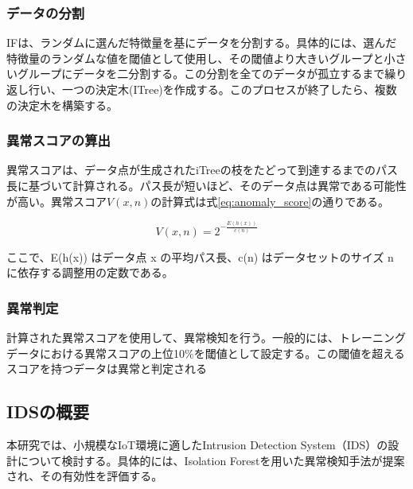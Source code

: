 \documentclass{css}
\begin{document}
\subsubsection{データの分割}

IFは、ランダムに選んだ特徴量を基にデータを分割する。具体的には、選んだ特徴量のランダムな値を閾値として使用し、その閾値より大きいグループと小さいグループにデータを二分割する。この分割を全てのデータが孤立するまで繰り返し行い、一つの決定木(ITree)を作成する。このプロセスが終了したら、複数の決定木を構築する。

\subsubsection{異常スコアの算出}

異常スコアは、データ点が生成されたiTreeの枝をたどって到達するまでのパス長に基づいて計算される。パス長が短いほど、そのデータ点は異常である可能性が高い。異常スコア$V(x,n)$の計算式は式\ref{eq:anomaly_score}の通りである。


\begin{equation}
    V(x, n) = 2^{-\frac{E(h(x))}{c(n)}}
    \label{eq:anomaly_score}
\end{equation}


ここで、E(h(x)) はデータ点 x の平均パス長、c(n) はデータセットのサイズ n に依存する調整用の定数である。

\subsubsection{異常判定}

計算された異常スコアを使用して、異常検知を行う。一般的には、トレーニングデータにおける異常スコアの上位10\%を閾値として設定する。この閾値を超えるスコアを持つデータは異常と判定される


\subsection{IDSの概要}
本研究では、小規模なIoT環境に適したIntrusion Detection System（IDS）の設計について検討する。具体的には、Isolation Forestを用いた異常検知手法が提案され、その有効性を評価する。
\end{document}
